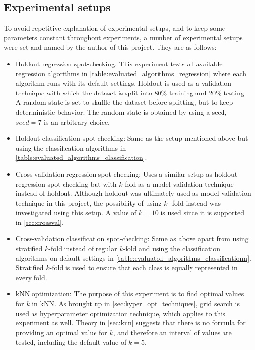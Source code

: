 	\subsection{Experimental setups} \label{sec:exp_setups}
	To avoid repetitive explanation of experimental setups, and to keep some parameters constant throughout experiments, a number of experimental setups were set and named by the author of this project. They are as follows:

	\begin{itemize}
		\item{Holdout regression spot-checking: } This experiment tests all available regression algorithms in \ref{table:evaluated_algorithms_regression} where each algorithm runs with its default settings. 
			Holdout is used as a validation technique with which the dataset is split into 80\% training and 20\% testing. A random state is set 					 to shuffle the dataset before splitting, but to keep deterministic behavior. The random state is obtained by using a seed, $seed= 7$ is an arbitrary choice. 
		\item{Holdout classification spot-checking: } Same as the setup mentioned above but using the classification algorithms in \ref{table:evaluated_algorithms_classification}.
		\item{Cross-validation regression spot-checking: } Uses a similar setup as holdout regression spot-checking but with $k$-fold as a model validation 				technique instead of holdout. Although holdout was ultimately used as model validation technique in this project, the possibility of using $k$-				fold instead was investigated using this setup. A value of $k = 10$ is used since it is supported in \ref{sec:crossval}.
		\item{Cross-validation classification spot-checking: } Same as above apart from using stratified $k$-fold instead of regular $k$-fold and using the 				classification algorithms on default settings in \ref{table:evaluated_algorithms_classificationn}. Stratified $k$-fold is used to ensure that each class is equally represented in every fold. 
		\item{kNN optimization: } The purpose of this experiment is to find optimal values for $k$ in kNN. As brought up in \ref{sec:hyper_opt_techniques}, 				grid search is used as hyperparameter optimization technique, which applies to this experiment as well. Theory in \ref{sec:knn} suggests that 				there is no formula for providing an optimal value for $k$, and therefore an interval of values are tested, including the default value of $k=5$. 

\end{itemize}

